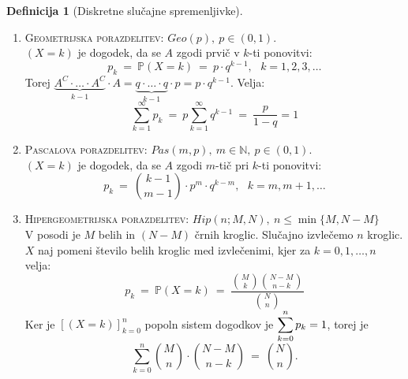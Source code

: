 \documentclass[11pt]{article}
\theoremstyle{definition}
\newtheorem{definicija}{Definicija}[section]
\theoremstyle{definition}
\theoremstyle{definition}
\begin{document}
\begin{definicija}[Diskretne slučajne spremenljivke]
\begin{enumerate}
	\item \textsc{Geometrijska porazdelitev}: $Geo(p), ~p \in (0, 1)$.\\
	$(X = k)$ je dogodek, da se $A$ zgodi prvič v $k$-ti ponovitvi:
	$$p_k ~=~ \mathbb{P}(X = k) ~=~ p \cdot q^{k-1}, ~~~k = 1, 2, 3, \ldots$$
	Torej $\underbrace{A^C \cdot \ldots \cdot A^C}_{k-1} \cdot A = \underbrace{q \cdot \ldots \cdot q}_{k-1} \cdot p = p \cdot q^{k-1}.$ Velja:
	$$\sum_{k=1}^{\infty} p_k ~=~ p \sum_{k=1}^{\infty} q^{k-1} ~=~ \frac{p}{1-q} = 1$$
	
	\item \textsc{Pascalova porazdelitev}: $Pas(m, p), ~m \in \mathbb{N}, ~p \in (0, 1).$\\
	$(X = k)$ je dogodek, da se $A$ zgodi $m$-tič pri $k$-ti ponovitvi:
	$$p_k ~=~ \binom{k-1}{m-1} \cdot p^m \cdot q^{k-m}, ~~~k = m, m+1, \ldots$$
	
	\item \textsc{Hipergeometrijska porazdelitev}: $Hip(n; M, N), ~n \leq \min{\{M, N-M\}}$\\
	V posodi je $M$ belih in $(N-M)$ črnih kroglic. Slučajno izvlečemo $n$ kroglic. $X$ naj pomeni število belih kroglic med izvlečenimi, kjer za $k = 0, 1, \ldots, n$ velja:
	$$p_k ~=~ \mathbb{P}(X = k) ~=~ \frac{\binom{M}{k} \binom{N-M}{n-k}}{\binom{N}{n}}$$
	Ker je $\left[(X = k)\right]_{k=0}^n$ popoln sistem dogodkov je $\mathlarger{\sum_{k=0}^n p_k = 1}$, torej je
	$$\sum_{k=0}^n \binom{M}{n} \cdot \binom{N-M}{n-k} ~=~ \binom{N}{n}.$$
\end{enumerate}

\end{definicija}
\vspace{0.5cm}
\end{document}
